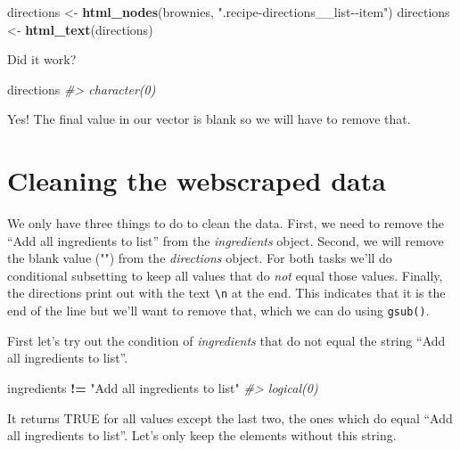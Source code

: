 \documentclass[
  12pt,
]{book}
\newenvironment{Shaded}{\begin{snugshade}}{\end{snugshade}}
\newcommand{\CommentTok}[1]{\textcolor[rgb]{0.56,0.35,0.01}{\textit{#1}}}
\newcommand{\KeywordTok}[1]{\textcolor[rgb]{0.13,0.29,0.53}{\textbf{#1}}}
\newcommand{\NormalTok}[1]{#1}
\newcommand{\OperatorTok}[1]{\textcolor[rgb]{0.81,0.36,0.00}{\textbf{#1}}}
\newcommand{\StringTok}[1]{\textcolor[rgb]{0.31,0.60,0.02}{#1}}
\begin{document}
\begin{Shaded}
\begin{Highlighting}[]
\NormalTok{directions <{-}}\StringTok{ }\KeywordTok{html\_nodes}\NormalTok{(brownies, }\StringTok{".recipe{-}directions\_\_list{-}{-}item"}\NormalTok{)}
\NormalTok{directions <{-}}\StringTok{ }\KeywordTok{html\_text}\NormalTok{(directions)}
\end{Highlighting}
\end{Shaded}

Did it work?

\begin{Shaded}
\begin{Highlighting}[]
\NormalTok{directions}
\CommentTok{\#> character(0)}
\end{Highlighting}
\end{Shaded}

Yes! The final value in our vector is blank so we will have to remove that.

\hypertarget{cleaning-the-webscraped-data}{%
\section{Cleaning the webscraped data}\label{cleaning-the-webscraped-data}}

We only have three things to do to clean the data. First, we need to remove the ``Add all ingredients to list'' from the \emph{ingredients} object. Second, we will remove the blank value ("") from the \emph{directions} object. For both tasks we'll do conditional subsetting to keep all values that do \emph{not} equal those values. Finally, the directions print out with the text \texttt{\textbackslash{}n} at the end. This indicates that it is the end of the line but we'll want to remove that, which we can do using \texttt{gsub()}.

First let's try out the condition of \emph{ingredients} that do not equal the string ``Add all ingredients to list''.

\begin{Shaded}
\begin{Highlighting}[]
\NormalTok{ingredients }\OperatorTok{!=}\StringTok{ "Add all ingredients to list"}
\CommentTok{\#> logical(0)}
\end{Highlighting}
\end{Shaded}

It returns TRUE for all values except the last two, the ones which do equal ``Add all ingredients to list''. Let's only keep the elements without this string.
\end{document}
